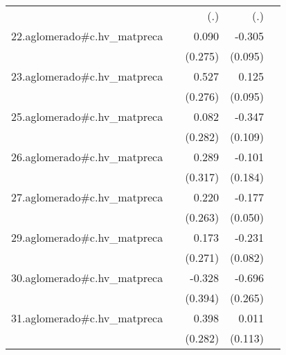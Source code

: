{\begin{longtable}{l*{4}{D{.}{.}{-1}}}
            &                     &         (.)         &         (.)         &                     \\
\addlinespace
22.aglomerado#c.hv\_matpreca&                     &       0.090         &      -0.305\sym{**} &                     \\
            &                     &     (0.275)         &     (0.095)         &                     \\
\addlinespace
23.aglomerado#c.hv\_matpreca&                     &       0.527         &       0.125         &                     \\
            &                     &     (0.276)         &     (0.095)         &                     \\
\addlinespace
25.aglomerado#c.hv\_matpreca&                     &       0.082         &      -0.347\sym{**} &                     \\
            &                     &     (0.282)         &     (0.109)         &                     \\
\addlinespace
26.aglomerado#c.hv\_matpreca&                     &       0.289         &      -0.101         &                     \\
            &                     &     (0.317)         &     (0.184)         &                     \\
\addlinespace
27.aglomerado#c.hv\_matpreca&                     &       0.220         &      -0.177\sym{***}&                     \\
            &                     &     (0.263)         &     (0.050)         &                     \\
\addlinespace
29.aglomerado#c.hv\_matpreca&                     &       0.173         &      -0.231\sym{**} &                     \\
            &                     &     (0.271)         &     (0.082)         &                     \\
\addlinespace
30.aglomerado#c.hv\_matpreca&                     &      -0.328         &      -0.696\sym{**} &                     \\
            &                     &     (0.394)         &     (0.265)         &                     \\
\addlinespace
31.aglomerado#c.hv\_matpreca&                     &       0.398         &       0.011         &                     \\
            &                     &     (0.282)         &     (0.113)         &                     \\

\end{longtable}}
